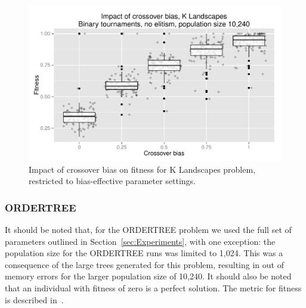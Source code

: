 \documentclass{sig-alternate}
\newcommand{\citep}[1]{\cite{#1}}
\begin{document}
\begin{figure}
\centering
\includegraphics[width=0.45 \textwidth]{Plots/KLandscapes6_XO_bias_strong_impact_alpha_075.pdf}
\caption{Impact of crossover bias on fitness for K Landscapes problem, restricted to bias-effective parameter settings.}
\label{fig:KLandscapes6_strong_results}
\end{figure}

%
%
%
%

%
%
%
%

\subsubsection{ORDERTREE}

It should be noted that, for the ORDERTREE problem we used the full set of parameters outlined in
Section~\ref{sec:Experiments}, with one exception: the population size for the ORDERTREE runs was limited to 1,024.
This was a consequence of the large trees generated for this problem, resulting in out of memory errors for the larger
population size of 10,240. It should also be noted that an individual with fitness of zero is a perfect solution. The metric for fitness is described in~\citep{hoang2006ordertree}.
\end{document}
